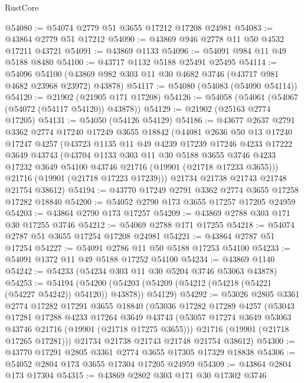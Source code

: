 \begin{lexlean}{RustCore}
\begin{coremodule}
@54080 := @54074 @2779 @51 @3655 @17212 @17208 @24981
@54083 := @43864 @2779 @51 @17212
@54090 := @43869 @946 @2778 @11 @50 @4532 @17211 @43721
@54091 := @43869 @1133
@54096 := @54091 @984 @11 @49 @5188 @8480
@54100 := @43717 @1132 @5188 @25491 @25495
@54114 := @54096
    @54100
    (@43869 @982 @303 @11 @30 @4682 @3746 (@43717 @981 @4682 @23968 @23972) @43878)
@54117 := @54080 (@54083 (@54090 @54114))
@54120 := @21902 (@21905 @171 @17208)
@54126 := @54058 (@54061 (@54067 (@54072 (@54117 @54120)) @43878))
@54129 := @21902 (@25163 @2774 @17205)
@54131 := @54050 (@54126 @54129)
@54186 := @43677
    @2637
    @2791
    @3362
    @2774
    @17240
    @17249
    @3655
    @18842
    (@44081
      @2636
      @50
      @13
      @17240
      @17247
      @4257
      (@43723
        @1135
        @11
        @49
        @4239
        @17239
        @17246
        @4233
        @17222
        @3649
        @43743
        (@43704
          @1133
          @303
          @11
          @30
          @5188
          @3655
          @3746
          @4233
          @17232
          @3649
          @54100
          @43746
          @21716
          (@19901 (@21718 @17233 @3655)))
        @21716
        (@19901 (@21718 @17223 @17239)))
      @21734
      @21738
      @21743
      @21748
      @21754
      @38612)
@54194 := @43770 @17249 @2791 @3362 @2774 @3655 @17258 @17282 @18840
@54200 := @54052 @2790 @173 @3655 @17257 @17205 @24959
@54203 := @43864 @2790 @173 @17257
@54209 := @43869 @2788 @303 @171 @30 @17255 @3746
@54212 := @54069 @2788 @171 @17255
@54218 := @54074 @2787 @51 @3655 @17254 @17208 @24981
@54221 := @43864 @2787 @51 @17254
@54227 := @54091 @2786 @11 @50 @5188 @17253 @54100
@54233 := @54091 @1372 @11 @49 @5188 @17252 @54100
@54234 := @43869 @1140
@54242 := @54233 (@54234 @303 @11 @30 @5204 @3746 @53063 @43878)
@54253 := @54194
    (@54200 (@54203 (@54209 (@54212 (@54218 (@54221 (@54227 @54242)) @54120)) @43878)) @54129)
@54292 := @53026
    @2805
    @3361
    @2774
    @17282
    @17291
    @3655
    @18840
    (@53036
      @17282
      @17289
      @4257
      (@53043
        @17281
        @17288
        @4233
        @17264
        @3649
        @43743
        (@53057 @17274 @3649 @53063 @43746 @21716 (@19901 (@21718 @17275 @3655)))
        @21716
        (@19901 (@21718 @17265 @17281)))
      @21734
      @21738
      @21743
      @21748
      @21754
      @38612)
@54300 := @43770 @17291 @2805 @3361 @2774 @3655 @17305 @17329 @18838
@54306 := @54052 @2804 @173 @3655 @17304 @17205 @24959
@54309 := @43864 @2804 @173 @17304
@54315 := @43869 @2802 @303 @171 @30 @17302 @3746

\end{coremodule}
\end{lexlean}
